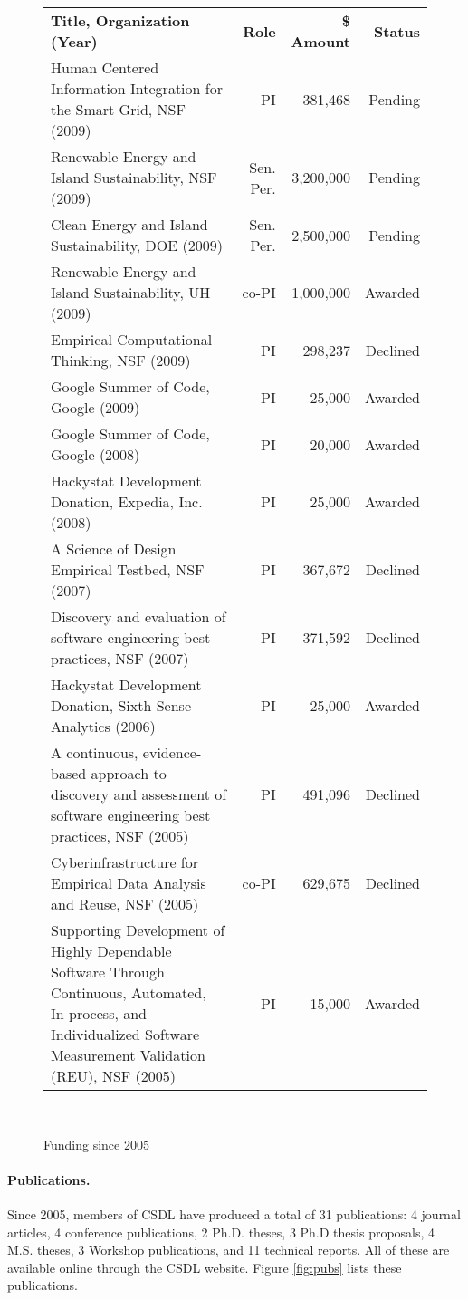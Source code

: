 \documentclass[11pt]{article}
\begin{document}
\begin{figure}[ht]
\small
\begin{tabular}{p{4.5in}rrr} \hline
{\bf Title, Organization (Year)} & {\bf Role} & {\bf \$ Amount} & {\bf Status} \\
Human Centered Information Integration for the Smart Grid, NSF (2009) & PI
& 381,468 & Pending \\
Renewable Energy and Island Sustainability, NSF (2009) & Sen. Per. & 3,200,000 & Pending \\
Clean Energy and Island Sustainability, DOE (2009) & Sen. Per. & 2,500,000 & Pending \\
Renewable Energy and Island Sustainability, UH (2009) & co-PI & 1,000,000 & Awarded  \\
Empirical Computational Thinking, NSF (2009) & PI & 298,237 & Declined \\
Google Summer of Code, Google (2009) & PI & 25,000 & Awarded \\
Google Summer of Code, Google (2008) & PI & 20,000 & Awarded \\
Hackystat Development Donation, Expedia, Inc. (2008) & PI & 25,000 & Awarded \\
A Science of Design Empirical Testbed, NSF (2007) & PI & 367,672 & Declined \\
Discovery and evaluation of software engineering best practices, NSF (2007) & PI & 371,592 & Declined \\
Hackystat Development Donation, Sixth Sense Analytics (2006) & PI & 25,000 & Awarded \\
A continuous, evidence-based approach to discovery and assessment of software engineering best practices, NSF (2005) & PI & 491,096 & Declined\\
Cyberinfrastructure for Empirical Data Analysis and Reuse, NSF (2005) & co-PI & 629,675 & Declined \\
Supporting Development of Highly Dependable Software Through Continuous, Automated, In-process, and Individualized Software Measurement Validation (REU), NSF (2005) & PI & 15,000 & Awarded \\ \hline
\end{tabular} \\ 
\normalsize
\caption{Funding since 2005}
\label{fig:funding}
\end{figure}



\paragraph{Publications.}  Since 2005, members of CSDL have produced a total of 31 publications: 4 journal articles, 4 conference publications, 2 Ph.D. theses, 3 Ph.D thesis proposals, 4 M.S. theses, 3 Workshop publications, and 11 technical reports.  All of these are available online through the CSDL website.  Figure \ref{fig:pubs} lists these publications. 
\end{document}
